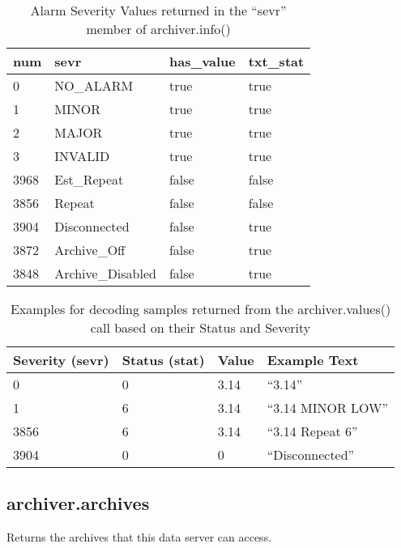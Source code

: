 \begin{table}[htbp]
  \begin{center}
    \sffamily
    \begin{tabular}[t]{l|l|l|l}
     num & sevr             & has\_value & txt\_stat \\
    \hline
       0 & NO\_ALARM        & true       & true  \\
       1 & MINOR            & true       & true  \\
       2 & MAJOR            & true       & true  \\
       3 & INVALID          & true       & true  \\
    3968 & Est\_Repeat      & false      & false \\
    3856 & Repeat           & false      & false \\
    3904 & Disconnected     & false      & true  \\
    3872 & Archive\_Off     & false      & true  \\
    3848 & Archive\_Disabled& false      & true
    \end{tabular}
    \caption{Alarm Severity Values returned in the ``sevr'' member of archiver.info()}
    \label{tab:sevr}
  \end{center}
\end{table}

\begin{table}[htbp]
  \begin{center}
    \sffamily
    \begin{tabular}[t]{l|l|l|l}
    Severity (sevr) & Status (stat) & Value & Example Text \\
    \hline
                  0 &            0  &  3.14 & ``3.14'' \\
                  1 &            6  &  3.14 & ``3.14 MINOR LOW'' \\
               3856 &            6  &  3.14 & ``3.14 Repeat 6'' \\
               3904 &            0  &  0    & ``Disconnected'' \\
    \end{tabular}
    \caption{Examples for decoding samples returned from the
    archiver.values() call based on their Status and Severity}
    \label{tab:statsevrexample}
  \end{center}
\end{table}

\subsection{archiver.archives} %
Returns the archives that this data server can access.

